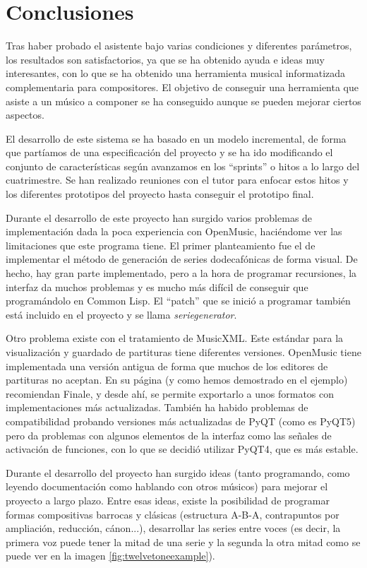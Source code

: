\documentclass[a4paper,openany,oneside,12pt]{book}
\begin{document}
\chapter{Conclusiones}\label{conclusiones}
Tras haber probado el asistente bajo varias condiciones y diferentes parámetros, los resultados son satisfactorios, ya que se ha obtenido ayuda e ideas muy interesantes, con lo que se ha obtenido una herramienta musical informatizada complementaria para compositores. El objetivo de conseguir una herramienta que asiste a un músico a componer se ha conseguido aunque se pueden mejorar ciertos aspectos.

El desarrollo de este sistema se ha basado en un modelo incremental, de forma que partíamos de una especificación del proyecto y se ha ido modificando el conjunto de características según avanzamos en los ``sprints'' o hitos a lo largo del cuatrimestre. Se han realizado reuniones con el tutor para enfocar estos hitos y los diferentes prototipos del proyecto hasta conseguir el prototipo final.

Durante el desarrollo de este proyecto han surgido varios problemas de implementación dada la poca experiencia con OpenMusic, haciéndome ver las limitaciones que este programa tiene. El primer planteamiento fue el de implementar el método de generación de series dodecafónicas de forma visual. De hecho, hay gran parte implementado, pero a la hora de programar recursiones, la interfaz da muchos problemas y es mucho más difícil de conseguir que programándolo en Common Lisp. El ``patch'' que se inició a programar también está incluido en el proyecto y se llama \emph{seriegenerator}.

Otro problema existe con el tratamiento de MusicXML. Este estándar para la visualización y guardado de partituras tiene diferentes versiones. OpenMusic tiene implementada una versión antigua de forma que muchos de los editores de partituras no aceptan. En su página (y como hemos demostrado en el ejemplo) recomiendan Finale, y desde ahí, se permite exportarlo a unos formatos con implementaciones más actualizadas. También ha habido problemas de compatibilidad probando versiones más actualizadas de PyQT (como es PyQT5) pero da problemas con algunos elementos de la interfaz como las señales de activación de funciones, con lo que se decidió utilizar PyQT4, que es más estable.

Durante el desarrollo del proyecto han surgido ideas (tanto programando, como leyendo documentación como hablando con otros músicos) para mejorar el proyecto a largo plazo. Entre esas ideas, existe la posibilidad de programar formas compositivas barrocas y clásicas (estructura A-B-A, contrapuntos por ampliación, reducción, cánon...), desarrollar las series entre voces (es decir, la primera voz puede tener la mitad de una serie y la segunda la otra mitad como se puede ver en la imagen \ref{fig:twelvetoneexample}).
\end{document}
